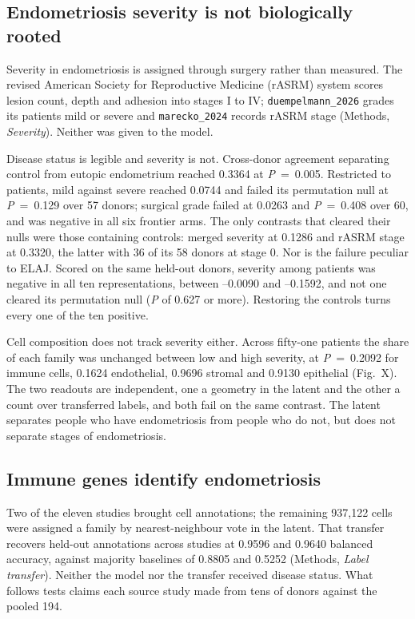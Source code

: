 \documentclass[11pt]{article}
\newcommand{\elaj}{ELAJ\xspace}
\begin{document}
\subsection*{Endometriosis severity is not biologically rooted}

Severity in endometriosis is assigned through surgery rather than measured. The
revised American Society for Reproductive Medicine (rASRM) system scores lesion
count, depth and adhesion into stages I to IV; \texttt{duempelmann\_2026}
grades its patients mild or severe and \texttt{marecko\_2024} records rASRM
stage (Methods, \emph{Severity}). Neither was given to the model.

Disease status is legible and severity is not. Cross-donor agreement
separating control from eutopic endometrium reached 0.3364 at \textit{P}~=~0.005.
Restricted to patients, mild against severe reached 0.0744 and failed its
permutation null at \textit{P}~=~0.129 over 57 donors; surgical grade failed at
0.0263 and \textit{P}~=~0.408 over 60, and was negative in all six frontier arms.
The only contrasts that cleared their nulls were those
containing controls: merged severity at 0.1286 and rASRM stage at 0.3320,
the latter with 36 of its 58 donors at stage 0. Nor is the failure peculiar
to \elaj{}. Scored on the same held-out donors, severity among patients was
negative in all ten representations, between --0.0090 and --0.1592, and
not one cleared its permutation null (\textit{P} of 0.627 or more). Restoring the
controls turns every one of the ten positive.

Cell composition does not track severity either. Across fifty-one patients
the share of each family was unchanged between low and high severity, at
\textit{P}~=~0.2092 for immune cells, 0.1624 endothelial, 0.9696 stromal and 0.9130
epithelial (Fig.~X). The two readouts are independent, one a geometry in the
latent and the other a count over transferred labels, and both fail on the
same contrast. The latent separates people who have endometriosis from
people who do not, but does not separate stages of endometriosis.

\subsection*{Immune genes identify endometriosis}

Two of the eleven studies brought cell annotations; the remaining 937,122
cells were assigned a family by nearest-neighbour vote in the latent. That
transfer recovers held-out annotations across studies at 0.9596 and 0.9640
balanced accuracy, against majority baselines of 0.8805 and 0.5252
(Methods, \emph{Label transfer}). Neither the model nor the transfer
received disease status. What follows tests claims each source study made
from tens of donors against the pooled 194.
\end{document}
